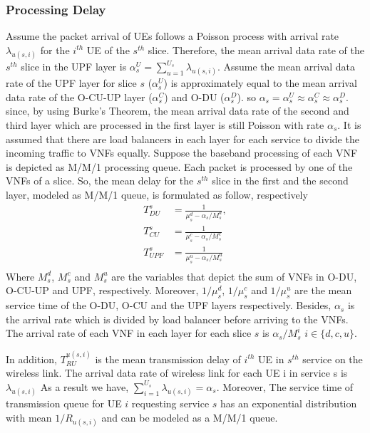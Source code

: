 \documentclass[conference]{IEEEtran}
\begin{document}
\subsubsection{Processing Delay}
Assume the packet arrival of UEs follows a Poisson process with arrival rate $\lambda_{u(s,i)}$ for the $i^{th}$ UE of the $s^{th}$ slice.
Therefore, the mean arrival data rate of the $s^{th}$ slice in the UPF layer is $\alpha_{s}^U = \sum_{u=1}^{U_s}\lambda_{u(s,i)}$.
Assume the mean arrival data rate of the UPF layer for slice $s$ ($\alpha_{s}^U$) is approximately equal to the mean arrival data rate of the O-CU-UP layer ($\alpha_{s}^C$) and O-DU ($\alpha_{s}^D$). so $\alpha_{s} =\alpha_{s}^U \approx \alpha_{s}^C \approx \alpha_{s}^D$. since, by using Burke’s Theorem, the mean arrival data rate of the second and third layer which are processed in the first layer is still Poisson with rate $\alpha_{s}$.
It is assumed that there are load balancers in each layer for each service to divide the incoming traffic to VNFs equally. %
Suppose the baseband processing of each VNF is depicted as M/M/1 processing queue.
Each packet is processed by one of the VNFs of a slice. So, the mean delay for the $s^{th}$ slice in the first and the second layer, modeled as M/M/1 queue, is formulated as follow, respectively
\begin{equation}
\begin{split}
T_{DU}^{s} &= \frac{1}{\mu_s^d - \alpha_{s}/{M_s^{d}}},\\
T_{CU}^{s} &= \frac{1}{\mu_s^c - \alpha_{s}/{M_s^{c}}}\\
T_{UPF}^{s} &= \frac{1}{\mu_s^u - \alpha_{s}/{M_s^{u}}}\\
\end{split}
\end{equation}
Where $M_s^{d}$, $M_s^{c}$ and 
$M_s^{u}$ are the variables that depict the sum of VNFs in O-DU, O-CU-UP and UPF, respectively. 
Moreover, $1/\mu_s^d$, $1/\mu_s^c$ and $1/\mu_s^u$ are the mean service time of the O-DU, O-CU and the UPF layers respectively.
Besides, $\alpha_{s}$ is the  arrival rate which is divided
by load balancer before arriving to the VNFs. The arrival rate of each VNF in each layer for each slice 
$s$ is $\alpha_{s}/{M_s^{i}}$ $ i \in \{d,c, u\}$.

In addition, $T_{RU}^{u(s,i)}$ is the mean transmission delay of $i^{th}$ UE in $s^{th}$ service on the wireless link.
 The arrival data rate of wireless link for each UE i in service s is $\lambda_{u(s,i)}$
As a result we have, $\sum_{i = 1}^{U_s} \lambda_{u(s,i)} = \alpha_s$.
Moreover, The service time of transmission queue for UE $i$ requesting service $s$ has
an exponential distribution with mean $1/R_{u(s,i)}$ and can be modeled as a M/M/1 queue.
 
\end{document}
